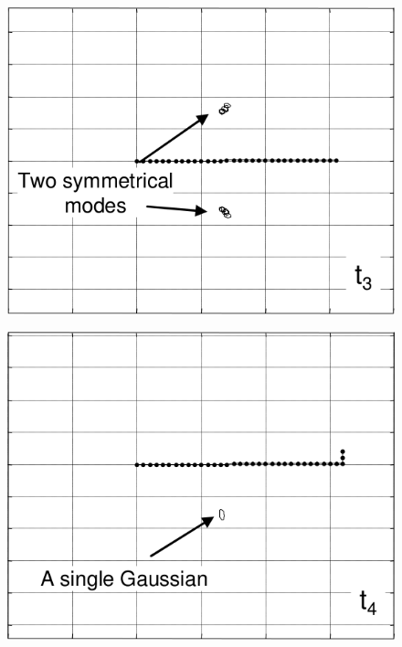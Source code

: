 \documentclass{beamer}
\begin{document}
\begin{frame}
\begin{columns}
\begin{overlayarea}{\textwidth}{.5\textheight}
{\begin{figure}
						\caption{\cite{blanco2008efficient}}
					\end{figure}
				}
				{
					\begin{figure}
						\centering
						\includegraphics[width=\linewidth]{blanco2008efficient_fig3_3}
						\caption{\cite{blanco2008efficient}}
					\end{figure}
				}
				{
					\begin{figure}
						\centering
						\includegraphics[width=\linewidth]{blanco2008efficient_fig3_4}
						\caption{\cite{blanco2008efficient}}
					\end{figure}
}
\end{overlayarea}
\end{columns}
\end{frame}
\end{document}
